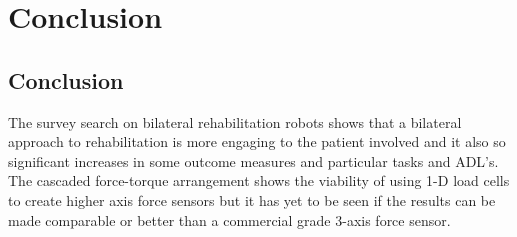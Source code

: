 \chapter{Conclusion} \label{Ch:5}
\section{Conclusion}
The survey search on bilateral rehabilitation robots shows that a bilateral approach to rehabilitation is more engaging to the patient involved and it also so significant increases in some outcome measures and particular tasks and ADL’s.\\
The cascaded force-torque arrangement shows the viability of using 1-D load cells to create higher axis force sensors but it has yet to be seen if the results can be made comparable or better than a commercial grade 3-axis force sensor.
